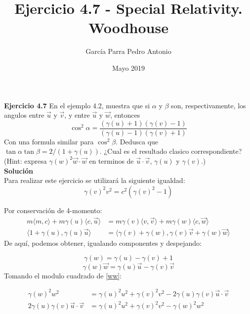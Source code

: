 \documentclass[0pt, letterpaper]{article}
\title{Ejercicio 4.7 - Special Relativity. Woodhouse}
\author{García Parra Pedro Antonio}
\date{Mayo 2019}
\newcommand{\vtor}[2]{
    \langle #1 , #2 \rangle
}
\begin{document}
\maketitle

\textbf{Ejercicio 4.7} En el ejemplo 4.2, muestra que si $\alpha$ y $\beta$ son, respectivamente, los angulos entre $\Vec{u}$ y $\Vec{v}$, y entre $\Vec{u}$ y $\Vec{w}$, entonces
\begin{equation}
    \cos^2\alpha = \frac{(\gamma(u) + 1)(\gamma(v) - 1)}{(\gamma(u) - 1)(\gamma(v) + 1)}
\end{equation}
Con una formula similar para $\cos^2\beta$. Dedusca que $\tan\alpha\tan\beta = 2/(1 + \gamma(u))$. ¿Cual es el resultado clasico correspondiente? (Hint: expresa $\gamma(w)^2\Vec{w}\cdot\Vec{w}$ en terminos de $\Vec{u}\cdot\Vec{v}$, $\gamma(u)$ y $\gamma(v)$.) \\

\textbf{Soluci\'on}\\

Para realizar este ejercicio se utilizar\'a la siguiente igualdad:
\begin{equation} \label{gammac2}
    \gamma(v)^2v^2 = c^2(\gamma(v)^2 - 1)
\end{equation}

Por conservaci\'on de 4-momento:
\begin{equation*}
    \begin{split}
        m\vtor{m}{c} + m\gamma(u)\vtor{c}{\Vec{u}} &= m\gamma(v)\vtor{v}{\Vec{v}} + m\gamma(w)\vtor{c}{\Vec{w}}\\
        \vtor{1 + \gamma(u)}{\gamma(u)\Vec{u}} &= \vtor{\gamma(v) + \gamma(w)}{\gamma(v)\Vec{v} + \gamma(w)\Vec{w}}
    \end{split}
\end{equation*}
De aqu\'i, podemos obtener, igualando componentes y despejando:

\begin{equation} \label{w}
    \gamma(w) = \gamma(u) - \gamma(v) + 1
\end{equation}
\begin{equation} \label{ww}
    \gamma(w)\Vec{w} = \gamma(u)\Vec{u} - \gamma(v)\Vec{v}
\end{equation}
Tomando el modulo cuadrado de \eqref{ww}:

\begin{equation*}
    \begin{split}
        \gamma(w)^2w^2 &= \gamma(u)^2u^2 + \gamma(v)^2v^2 - 2\gamma(u)\gamma(v)\Vec{u}\cdot\Vec{v}\\
        2\gamma(u)\gamma(v)\Vec{u}\cdot\Vec{v} &= \gamma(u)^2u^2 + \gamma(v)^2v^2 - \gamma(w)^2w^2
    \end{split}
\end{equation*}
\end{document}

